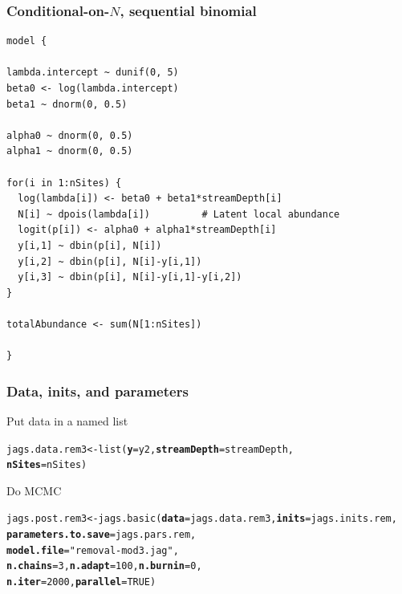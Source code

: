 \documentclass[color=usenames,dvipsnames]{beamer}\usepackage[]{graphicx}\usepackage[]{color}
\makeatletter
\newcommand{\hlnum}[1]{\textcolor[rgb]{0.69,0.494,0}{#1}}%
\newcommand{\hlstr}[1]{\textcolor[rgb]{0.749,0.012,0.012}{#1}}%
\newcommand{\hlstd}[1]{\textcolor[rgb]{0,0,0}{#1}}%
\newcommand{\hlkwb}[1]{\textcolor[rgb]{0,0.341,0.682}{#1}}%
\newcommand{\hlkwc}[1]{\textcolor[rgb]{0,0,0}{\textbf{#1}}}%
\newcommand{\hlkwd}[1]{\textcolor[rgb]{0.004,0.004,0.506}{#1}}%
\newenvironment{kframe}{%
 \def\at@end@of@kframe{}%
 \ifinner\ifhmode%
  \def\at@end@of@kframe{\end{minipage}}%
  \begin{minipage}{\columnwidth}%
 \fi\fi%
 \def\FrameCommand##1{\hskip\@totalleftmargin \hskip-\fboxsep
 \colorbox{shadecolor}{##1}\hskip-\fboxsep
     \hskip-\linewidth \hskip-\@totalleftmargin \hskip\columnwidth}%
 \MakeFramed {\advance\hsize-\width
   \@totalleftmargin\z@ \linewidth\hsize
   \@setminipage}}%
 {\par\unskip\endMakeFramed%
 \at@end@of@kframe}
\newenvironment{knitrout}{}{} %
\makeatother
\begin{document}
\begin{frame}[fragile]
  \frametitle{\normalsize Conditional-on-$N$, sequential binomial}
\begin{knitrout}\scriptsize
{}\color{fgcolor}\begin{kframe}
\begin{verbatim}
model {

lambda.intercept ~ dunif(0, 5)
beta0 <- log(lambda.intercept)
beta1 ~ dnorm(0, 0.5)

alpha0 ~ dnorm(0, 0.5)  
alpha1 ~ dnorm(0, 0.5)

for(i in 1:nSites) {
  log(lambda[i]) <- beta0 + beta1*streamDepth[i]
  N[i] ~ dpois(lambda[i])         # Latent local abundance
  logit(p[i]) <- alpha0 + alpha1*streamDepth[i]
  y[i,1] ~ dbin(p[i], N[i])
  y[i,2] ~ dbin(p[i], N[i]-y[i,1])
  y[i,3] ~ dbin(p[i], N[i]-y[i,1]-y[i,2])
}

totalAbundance <- sum(N[1:nSites])

}
\end{verbatim}
\end{kframe}
\end{knitrout}
\end{frame}





\begin{frame}[fragile]
  \frametitle{Data, inits, and parameters}
  Put data in a named list
  \vspace{-6pt}
\begin{knitrout}\small
{}\color{fgcolor}\begin{kframe}
\begin{alltt}
\hlstd{jags.data.rem3} \hlkwb{<-} \hlkwd{list}\hlstd{(}\hlkwc{y}\hlstd{=y2,} \hlkwc{streamDepth}\hlstd{=streamDepth,}
                       \hlkwc{nSites}\hlstd{=nSites)}
\end{alltt}
\end{kframe}
\end{knitrout}
\vfill
  Do MCMC
  \vspace{-6pt}
\begin{knitrout}\scriptsize
{}\color{fgcolor}\begin{kframe}
\begin{alltt}
\hlstd{jags.post.rem3} \hlkwb{<-} \hlkwd{jags.basic}\hlstd{(}\hlkwc{data}\hlstd{=jags.data.rem3,} \hlkwc{inits}\hlstd{=jags.inits.rem,}
                             \hlkwc{parameters.to.save}\hlstd{=jags.pars.rem,}
                             \hlkwc{model.file}\hlstd{=}\hlstr{"removal-mod3.jag"}\hlstd{,}
                             \hlkwc{n.chains}\hlstd{=}\hlnum{3}\hlstd{,} \hlkwc{n.adapt}\hlstd{=}\hlnum{100}\hlstd{,} \hlkwc{n.burnin}\hlstd{=}\hlnum{0}\hlstd{,}
                             \hlkwc{n.iter}\hlstd{=}\hlnum{2000}\hlstd{,} \hlkwc{parallel}\hlstd{=}\hlnum{TRUE}\hlstd{)}
\end{alltt}
\end{kframe}
\end{knitrout}
\end{frame}
\end{document}
